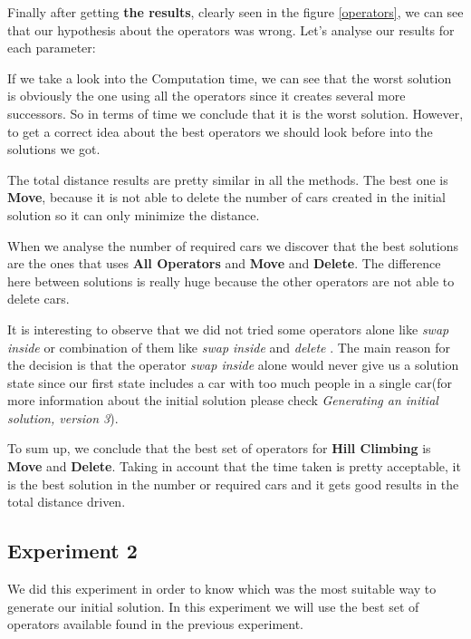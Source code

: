 \documentclass[12]{article}
\begin{document}
Finally after getting \textbf{the results}, clearly seen in the figure \ref{operators}, we can see that our hypothesis about the operators was wrong. Let's analyse our results for each parameter: 
\\
\smallskip

If we take a look into the Computation time, we can see that the worst solution is obviously the one using all the operators since it creates several more successors. So in terms of time we conclude that it is the worst solution. However, to get a correct idea about the best operators we should look before into the solutions we got. 
\\
\smallskip

The total distance results are pretty similar in all the methods. The best one is \textbf{Move}, because it is not able to delete the number of cars created in the initial solution so it can only minimize the distance.  
\\
\smallskip

When we analyse the number of required cars we discover that the best solutions are the ones that uses \textbf{All Operators} and \textbf{Move} and \textbf{Delete}. The difference here between solutions is really huge because the other operators are not  able to delete cars. 


It is interesting to observe that we did not tried some operators alone like \textit{swap inside} or combination of them like \textit{swap inside} and \textit{delete} . The main reason for the decision is that the operator \textit{swap inside} alone would never give us a solution state since our first state includes a car with too much people in a single car(for more information about the initial solution please check \textit{Generating an initial solution, version 3}). 
\\
\smallskip

To sum up, we conclude that the best set of operators for \textbf{Hill Climbing} is \textbf{Move} and \textbf{Delete}. Taking in account that the time taken is pretty acceptable, it is the best solution in the number or required cars and it gets good results in the total distance driven.

\subsection{Experiment 2}
We did this experiment in order to know which was the most suitable way to generate our initial solution. In this experiment we will use the best set of operators available found in the previous experiment.
\end{document}
